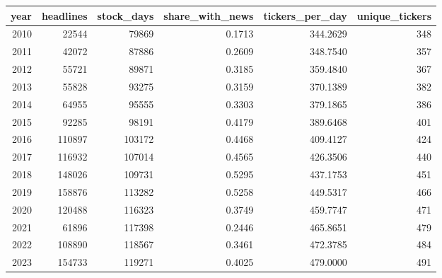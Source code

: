 \begin{tabular}{rrrrrr}
\toprule
year & headlines & stock\_days & share\_with\_news & tickers\_per\_day & unique\_tickers \\
\midrule
2010 & 22544 & 79869 & 0.1713 & 344.2629 & 348 \\
2011 & 42072 & 87886 & 0.2609 & 348.7540 & 357 \\
2012 & 55721 & 89871 & 0.3185 & 359.4840 & 367 \\
2013 & 55828 & 93275 & 0.3159 & 370.1389 & 382 \\
2014 & 64955 & 95555 & 0.3303 & 379.1865 & 386 \\
2015 & 92285 & 98191 & 0.4179 & 389.6468 & 401 \\
2016 & 110897 & 103172 & 0.4468 & 409.4127 & 424 \\
2017 & 116932 & 107014 & 0.4565 & 426.3506 & 440 \\
2018 & 148026 & 109731 & 0.5295 & 437.1753 & 451 \\
2019 & 158876 & 113282 & 0.5258 & 449.5317 & 466 \\
2020 & 120488 & 116323 & 0.3749 & 459.7747 & 471 \\
2021 & 61896 & 117398 & 0.2446 & 465.8651 & 479 \\
2022 & 108890 & 118567 & 0.3461 & 472.3785 & 484 \\
2023 & 154733 & 119271 & 0.4025 & 479.0000 & 491 \\
\bottomrule
\end{tabular}
